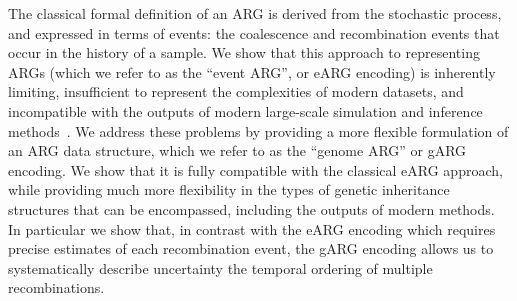 \documentclass{article}
\begin{document}
The classical formal definition of an ARG is derived from the
stochastic process, and expressed in terms of events:
the coalescence and recombination events
that occur in the history of a sample. We show that this approach
to representing ARGs (which we refer to as the ``event ARG'', or eARG
encoding) is inherently limiting, insufficient to represent
the complexities of modern datasets, and incompatible with
the outputs of modern large-scale simulation and inference
methods~\citep{kelleher2016efficient,speidel2019method,
kelleher2019inferring,zhang2023biobank}.
We address these problems by providing a more flexible formulation
of an ARG data structure, which we refer to as the ``genome ARG''
or gARG encoding. We show that it is fully compatible with the
classical eARG approach, while providing much more flexibility
in the types of genetic inheritance structures that can be encompassed,
including the outputs of modern methods.
In particular we show that, in contrast with the eARG encoding which
requires precise estimates of each recombination event,
the gARG encoding allows us to systematically describe uncertainty
the temporal ordering of multiple recombinations.
\end{document}
